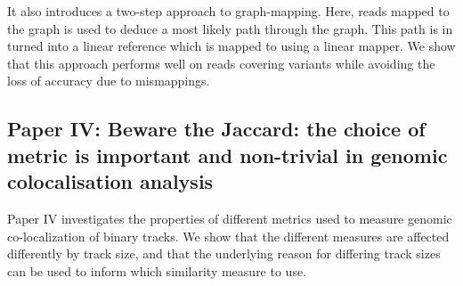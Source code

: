 It also introduces a two-step approach to graph-mapping.
Here, reads mapped to the graph is used to deduce a most likely path through the graph.
This path is in turned into a linear reference which is mapped to using a linear mapper.
We show that this approach performs well on reads covering variants while avoiding the loss of accuracy due to mismappings.

\subsection*{Paper IV: Beware the Jaccard: the choice of metric is important and non-trivial in genomic colocalisation analysis}
Paper IV investigates the properties of different metrics used to measure genomic co-localization of binary tracks.
We show that the different measures are affected differently by track size, and that the underlying reason for differing track sizes can be used to inform which similarity measure to use.

